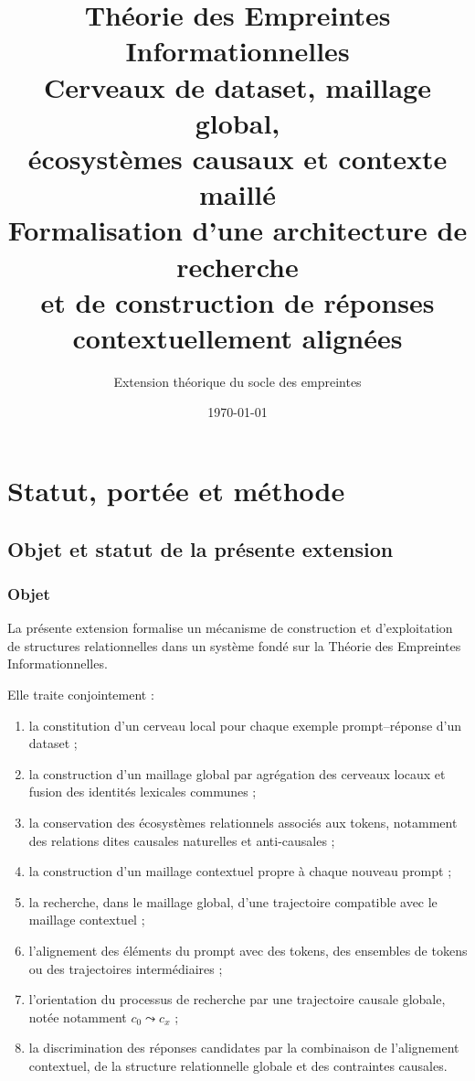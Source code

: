 \documentclass[11pt,a4paper,oneside]{book}
\title{
  \textbf{Théorie des Empreintes Informationnelles}\\[0.4em]
  \large Cerveaux de dataset, maillage global,\\
  écosystèmes causaux et contexte maillé\\[0.4em]
  \normalsize Formalisation d'une architecture de recherche\\
  et de construction de réponses contextuellement alignées
}
\author{Extension théorique du socle des empreintes}
\date{\today}
\theoremstyle{remark}
\begin{document}
\maketitle
\tableofcontents

\part{Statut, portée et méthode}

\chapter{Objet et statut de la présente extension}

\section{Objet}

La présente extension formalise un mécanisme de construction et
d'exploitation de structures relationnelles dans un système fondé sur
la Théorie des Empreintes Informationnelles.

Elle traite conjointement :

\begin{enumerate}[label=\arabic*.]
  \item la constitution d'un cerveau local pour chaque exemple
        prompt--réponse d'un dataset ;
  \item la construction d'un maillage global par agrégation des
        cerveaux locaux et fusion des identités lexicales communes ;
  \item la conservation des écosystèmes relationnels associés aux
        tokens, notamment des relations dites causales naturelles
        et anti-causales ;
  \item la construction d'un maillage contextuel propre à chaque
        nouveau prompt ;
  \item la recherche, dans le maillage global, d'une trajectoire
        compatible avec le maillage contextuel ;
  \item l'alignement des éléments du prompt avec des tokens, des
        ensembles de tokens ou des trajectoires intermédiaires ;
  \item l'orientation du processus de recherche par une trajectoire
        causale globale, notée notamment
        \(c_0\leadsto c_x\) ;
  \item la discrimination des réponses candidates par la
        combinaison de l'alignement contextuel, de la structure
        relationnelle globale et des contraintes causales.
\end{enumerate}
\end{document}
